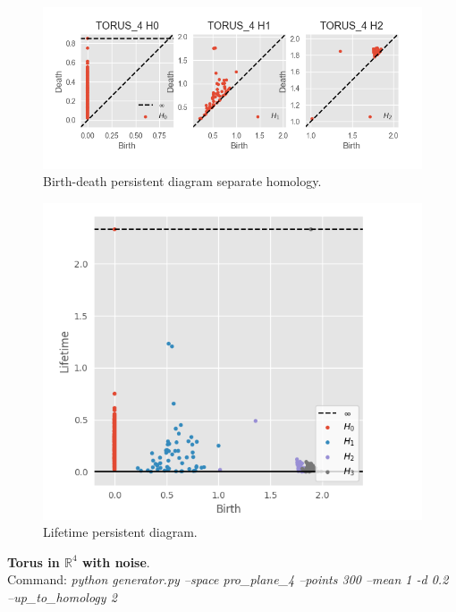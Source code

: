\documentclass[11pt,a4paper]{report}
\begin{document}
              \begin{figure}[H]
                \centering
                \includegraphics[width=\linewidth]{./ripser/on_torus4_sep.png}
                \caption{Birth-death persistent diagram separate homology.}
                \label{fig:sep hom}
              \end{figure}

              \begin{figure}[H]
                \centering
                \includegraphics[width=0.5\linewidth, scale=0.5]{./ripser/on_torus4_lifetime.png}
                \caption{Lifetime persistent diagram.}
                \label{fig:sep hom}
              \end{figure}
              
             \textbf{Torus in $\mathbb{R}^4$ with noise}.\\
              Command: \textit{python generator.py --space pro\_plane\_4 --points 300 --mean 1 -d 0.2 --up\_to\_homology 2}
\end{document}
